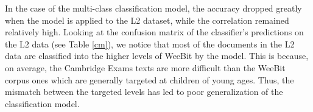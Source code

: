 \documentclass[11pt,letterpaper]{article}
\begin{document}
    \begin{table}[t]
    \centering
    \small
    \caption{Generalization results of the classification and ranking models trained on native data applied to language testing data }
    \label{resultgen}

    \end{table}
    
    In the case of the multi-class classification model, the accuracy dropped greatly when the model is applied to the L2 dataset, while the correlation remained relatively high. Looking at the confusion matrix of the classifier's predictions on the L2 data (see Table \ref{cm}), we notice that most of the documents in the L2 data are classified into the higher levels of WeeBit by the model. This is because, on average, the Cambridge Exams texts are more difficult than the WeeBit corpus ones which are generally targeted at children of young ages. Thus, the mismatch between the targeted levels has led to poor generalization of the classification model.
    
    
    	\begin{table}[t]
			\centering
			\small
			\caption{Confusion matrix of the classification model on the language testing data}
			\label{cm}

		\end{table}
\end{document}
